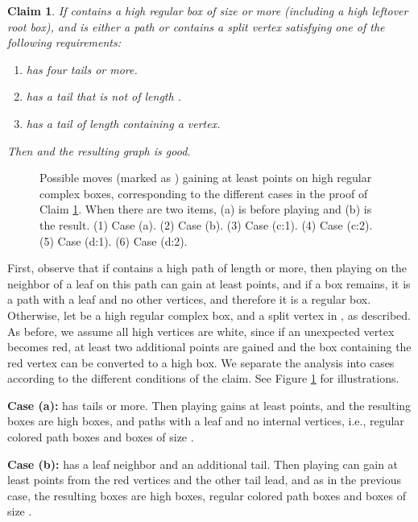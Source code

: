 \documentclass[11pt]{article}
\def\Proof{\par\noindent{\bf Proof:~}}
\def\dnsitem{\vspace{-7pt}\item}
\newtheorem{claim}[theorem]{Claim}
\theoremstyle{definition}
\begin{document}
\begin{claim}
\label{claim:dom_split_7}
If  contains a high regular box  of size  or more (including a high leftover root box), and  is either a path or contains a split vertex  satisfying one of the following requirements:
\begin{enumerate}
	\dnsitem 
	\label{claim:dom_split_7:4tails}
	 has four tails or more.
	\dnsitem 
	\label{claim:dom_split_7:not2}
	 has a tail that is not of length .
	\dnsitem
	\label{claim:dom_split_7:b3}
	 has a tail of length  containing a  vertex.
\end{enumerate}
Then  and the resulting graph  is good.
\end{claim}
\begin{figure}[thbp]
  \caption{\sf Possible moves (marked as ) gaining at least  points on high regular complex boxes, corresponding to the different cases in the proof of Claim \ref{claim:dom_split_7}.
		When there are two items, (a) is before playing  and (b) is the result.
		(1) Case (a).
		(2) Case (b). 
		(3) Case (c:1). 
		(4) Case (c:2). 
		(5) Case (d:1). 
		(6) Case (d:2).} 
  \medskip
  \centering
  \label{fig:dom_clean}
\end{figure}
\Proof
First, observe that if  contains a high path of length  or more, then playing on the neighbor of a leaf on this path can gain at least  points, 
and if a box remains, it is a path with a  leaf and no other  vertices, and therefore it is a regular box. 
Otherwise, let  be a high regular complex box, and  a split vertex in , as described.
As before, we assume all high vertices are white, since if an unexpected vertex becomes red, at least two additional points are gained and the box containing the red vertex can be converted to a high box.
We separate the analysis into cases according to the different conditions of the claim.
See Figure \ref{fig:dom_clean} for illustrations.

\bigskip
\par\noindent
{\bf Case (a):}
 has  tails or more.
Then playing  gains at least  points, and the resulting boxes are high boxes, and paths with a  leaf and no internal  vertices, i.e., regular colored path boxes and boxes of size .

\smallskip
\par\noindent
{\bf Case (b):}
 has a leaf neighbor and an additional tail.
Then playing  can gain at least  points from the red vertices and the other tail lead, and as in the previous case, the resulting boxes are high boxes, 
regular colored path boxes and boxes of size .
\end{document}
